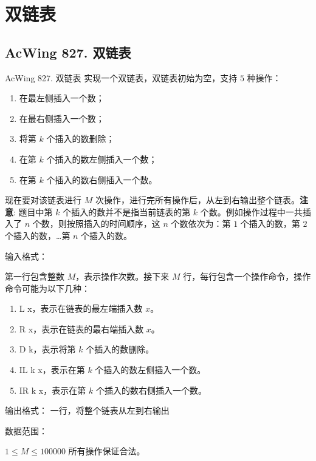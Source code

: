 \section{双链表}

\subsection{AcWing 827. 双链表}
\begin{titledbox}{AcWing 827. 双链表}
    实现一个双链表，双链表初始为空，支持 $5$ 种操作：

    \begin{enumerate}
        \itemsep=-5pt
        \item 在最左侧插入一个数；
        \item 在最右侧插入一个数；
        \item 将第 $k$ 个插入的数删除；
        \item 在第 $k$ 个插入的数左侧插入一个数；
        \item 在第 $k$ 个插入的数右侧插入一个数。
    \end{enumerate}

    现在要对该链表进行 $M$ 次操作，进行完所有操作后，从左到右输出整个链表。\textbf{注意}: 题目中第 $k$ 个插入的数并不是指当前链表的第 $k$ 个数。例如操作过程中一共插入了 $n$ 个数，则按照插入的时间顺序，这 $n$ 个数依次为：第 $1$ 个插入的数，第 $2$ 个插入的数，…第 $n$ 个插入的数。

    输入格式：

    第一行包含整数 $M$，表示操作次数。接下来 $M$ 行，每行包含一个操作命令，操作命令可能为以下几种：

    \begin{enumerate}
        \itemsep=-5pt
        \item L x，表示在链表的最左端插入数 $x$。
        \item R x，表示在链表的最右端插入数 $x$。
        \item D k，表示将第 $k$ 个插入的数删除。
        \item IL k x，表示在第 $k$ 个插入的数左侧插入一个数。
        \item IR k x，表示在第 $k$ 个插入的数右侧插入一个数。
    \end{enumerate}

    输出格式：
    一行，将整个链表从左到右输出

    数据范围：

    $1 \le M \le 100000$ 所有操作保证合法。


\end{titledbox}
